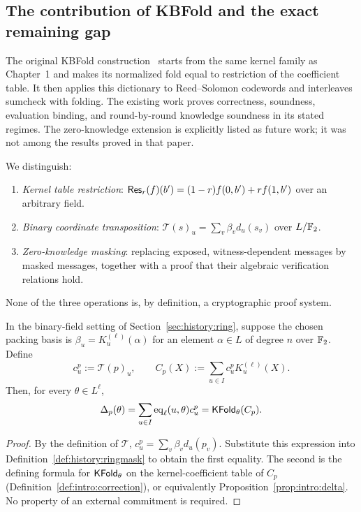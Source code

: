 \subsection{The contribution of KBFold and the exact remaining gap}\label{sec:history:scope}

The original KBFold construction~\cite{MkhidaKBFold2026} starts from the same kernel family as Chapter~1 and makes its normalized fold equal to restriction of the coefficient table. It then applies this dictionary to Reed--Solomon codewords and interleaves sumcheck with folding. The existing work proves correctness, soundness, evaluation binding, and round-by-round knowledge soundness in its stated regimes. The zero-knowledge extension is explicitly listed as future work; it was not among the results proved in that paper.

\begin{definition}\label{def:history:threeops}
We distinguish:
\begin{enumerate}[label=\textup{(\roman*)}]
 \item \emph{Kernel table restriction}: $\mathsf{Res}_r(f)(b')=(1-r)f(0,b')+rf(1,b')$ over an arbitrary field.
 \item \emph{Binary coordinate transposition}: $\mathcal T(s)_u=\sum_v\beta_vd_u(s_v)$ over $L/\mathbb{F}_2$.
 \item \emph{Zero-knowledge masking}: replacing exposed, witness-dependent messages by masked messages, together with a proof that their algebraic verification relations hold.
\end{enumerate}
None of the three operations is, by definition, a cryptographic proof system.
\end{definition}

\begin{lemma}\label{lem:history:kernelcorrection}
In the binary-field setting of Section~\ref{sec:history:ring}, suppose the chosen packing basis is $\beta_u=K_u^{(\ell)}(\alpha)$ for an element $\alpha\in L$ of degree $n$ over $\mathbb{F}_2$. Define
\[
 c_u^p:=\mathcal T(p)_u,\qquad
 C_p(X):=\sum_{u\in I}c_u^pK_u^{(\ell)}(X).
\]
Then, for every $\theta\in L^\ell$,
\[
 \Delta_p(\theta)
 =\sum_{u\in I}\operatorname{eq}_\ell(u,\theta)c_u^p
 =\mathsf{KFold}_\theta(C_p).
\]
\end{lemma}
\begin{proof}
By the definition of $\mathcal T$, $c_u^p=\sum_v\beta_vd_u(p_v)$. Substitute this expression into Definition~\ref{def:history:ringmask} to obtain the first equality. The second is the defining formula for $\mathsf{KFold}_\theta$ on the kernel-coefficient table of $C_p$ (Definition~\ref{def:intro:correction}), or equivalently Proposition~\ref{prop:intro:delta}. No property of an external commitment is required.
\end{proof}

